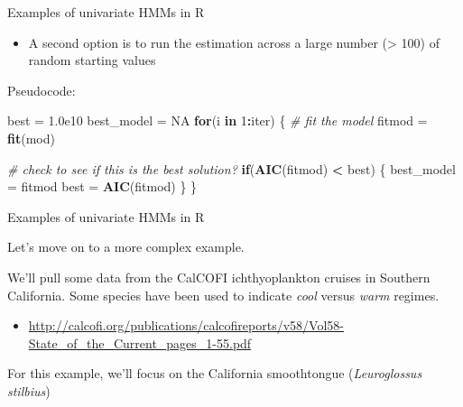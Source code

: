 \documentclass[
  ignorenonframetext,
]{beamer}
\newenvironment{Shaded}{\begin{snugshade}}{\end{snugshade}}
\newcommand{\CommentTok}[1]{\textcolor[rgb]{0.56,0.35,0.01}{\textit{#1}}}
\newcommand{\ControlFlowTok}[1]{\textcolor[rgb]{0.13,0.29,0.53}{\textbf{#1}}}
\newcommand{\DecValTok}[1]{\textcolor[rgb]{0.00,0.00,0.81}{#1}}
\newcommand{\FloatTok}[1]{\textcolor[rgb]{0.00,0.00,0.81}{#1}}
\newcommand{\KeywordTok}[1]{\textcolor[rgb]{0.13,0.29,0.53}{\textbf{#1}}}
\newcommand{\NormalTok}[1]{#1}
\newcommand{\OperatorTok}[1]{\textcolor[rgb]{0.81,0.36,0.00}{\textbf{#1}}}
\newcommand{\OtherTok}[1]{\textcolor[rgb]{0.56,0.35,0.01}{#1}}
\newcommand{\StringTok}[1]{\textcolor[rgb]{0.31,0.60,0.02}{#1}}
\providecommand{\tightlist}{%
  \setlength{\itemsep}{0pt}\setlength{\parskip}{0pt}}
\begin{document}
\begin{frame}[fragile]{Examples of univariate HMMs in R}
\protect\hypertarget{examples-of-univariate-hmms-in-r-14}{}

\begin{itemize}
\tightlist
\item
  A second option is to run the estimation across a large number
  (\textgreater{} 100) of random starting values
\end{itemize}

Pseudocode:

\begin{Shaded}
\begin{Highlighting}[]
\NormalTok{best =}\StringTok{ }\FloatTok{1.0e10}
\NormalTok{best_model =}\StringTok{ }\OtherTok{NA}
\ControlFlowTok{for}\NormalTok{(i }\ControlFlowTok{in} \DecValTok{1}\OperatorTok{:}\NormalTok{iter) \{}
  \CommentTok{# fit the model}
\NormalTok{  fitmod =}\StringTok{ }\KeywordTok{fit}\NormalTok{(mod)}
  
  \CommentTok{# check to see if this is the best solution?}
  \ControlFlowTok{if}\NormalTok{(}\KeywordTok{AIC}\NormalTok{(fitmod) }\OperatorTok{<}\StringTok{ }\NormalTok{best) \{}
\NormalTok{    best_model =}\StringTok{ }\NormalTok{fitmod}
\NormalTok{    best =}\StringTok{ }\KeywordTok{AIC}\NormalTok{(fitmod)}
\NormalTok{  \}}
\NormalTok{\}}
\end{Highlighting}
\end{Shaded}

\end{frame}

\begin{frame}{Examples of univariate HMMs in R}
\protect\hypertarget{examples-of-univariate-hmms-in-r-15}{}

Let's move on to a more complex example.

We'll pull some data from the CalCOFI ichthyoplankton cruises in
Southern California. Some species have been used to indicate \emph{cool}
versus \emph{warm} regimes.

\begin{itemize}
\tightlist
\item
  \url{http://calcofi.org/publications/calcofireports/v58/Vol58-State_of_the_Current_pages_1-55.pdf}
\end{itemize}

For this example, we'll focus on the California smoothtongue
(\emph{Leuroglossus stilbius})

\end{frame}
\end{document}
